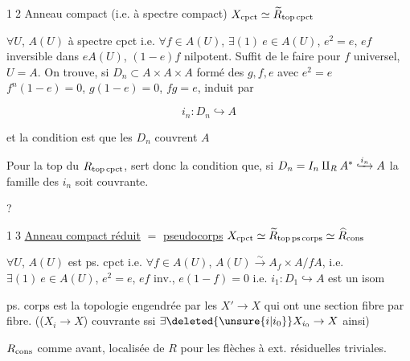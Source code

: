 

\textcircled{\scriptsize 12} Anneau compact (i.e. à spectre compact)\quad
$X_{\rm cpct}\simeq\widetilde R_{\mathrm{top\,cpct}}$

$\forall U$, $A(U)$ à spectre cpct i.e.
$\forall f\in A(U)$, $\exists(1)\ e\in A(U)$, $e^2=e$, $ef$ inversible dans $eA(U)$,
 $(1-e)f$ nilpotent. Suffit de le faire pour $f$ universel, $U=A$.
On trouve, si $D_n\subset A\times A\times A$ formé des $g,f,e$ avec $e^2=e$
$f^n(1-e)=0$, $g(1-e)=0$, $fg=e$,  induit par  

\[
 i_n:D_n\hookrightarrow A
\]

et la condition est que les $D_n$ couvrent $A$

Pour la top du $R_{\rm top\,cpct}$, sert donc la condition que, si
$D_n=I_n\amalg_R A^*\lhook\joinrel\xrightarrow{i_n}A$
la famille des $i_n$ soit couvrante.

\quad ?

\textcircled{\scriptsize 13} \uline{Anneau compact réduit} $=$ \uline{pseudocorps}
\quad $X_{\rm cpct}\simeq\widetilde R_{\mathrm{top\,ps\,corps}}\simeq\widehat R_{\rm cons}$

$\forall U$, $A(U)$ est ps. cpct i.e. $\forall f\in A(U)$, $A(U)\xrightarrow{\sim}A_f\times A/fA$, i.e.
$\exists(1)\ e\in A(U)$, $e^2=e$, $ef$ inv., $e(1-f)=0$
i.e. $i_1:D_1\hookrightarrow A$ est un isom

ps. corps est la topologie engendrée par les $X'\to X$ qui ont une section fibre par fibre.
(($X_i\to X$) couvrante ssi $\exists\deleted{\unsure{i|i_0}} X_{i_0}\to X$ ainsi)

$R_{\rm cons}$ comme avant, localisée de $R$ pour les  flèches 
à ext. résiduelles triviales.

